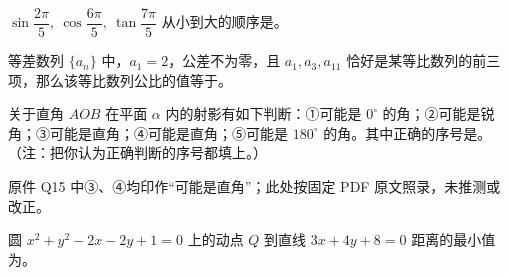 \begin{question}
\(\sin\dfrac{2\pi}{5},\ \cos\dfrac{6\pi}{5},\ \tan\dfrac{7\pi}{5}\) 从小到大的顺序是\gkblank{}。

\end{question}
\begin{question}
等差数列 \(\{a_n\}\) 中，\(a_1=2\)，公差不为零，且 \(a_1,a_3,a_{11}\) 恰好是某等比数列的前三项，那么该等比数列公比的值等于\gkblank{}。

\end{question}
\begin{question}
关于直角 \(AOB\) 在平面 \(\alpha\) 内的射影有如下判断：①可能是 \(0^\circ\) 的角；②可能是锐角；③可能是直角；④可能是直角；⑤可能是 \(180^\circ\) 的角。其中正确的序号是\gkblank{}。（注：把你认为正确判断的序号都填上。）

\begin{gktip}
原件 Q15 中③、④均印作“可能是直角”；此处按固定 PDF 原文照录，未推测或改正。
\end{gktip}

\end{question}
\begin{question}
圆 \(x^2+y^2-2x-2y+1=0\) 上的动点 \(Q\) 到直线 \(3x+4y+8=0\) 距离的最小值为\gkblank{}。

\end{question}

